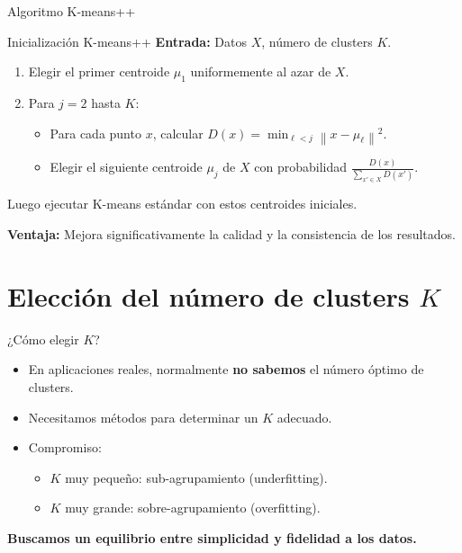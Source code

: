 \documentclass[aspectratio=169]{beamer}
\newcommand{\norm}[1]{\left\lVert #1 \right\rVert}
\begin{document}
\begin{frame}{Algoritmo K-means++}
    \begin{block}{Inicialización K-means++}
        \textbf{Entrada:} Datos \(X\), número de clusters \(K\).
        
        \begin{enumerate}
            \item Elegir el primer centroide \(\mu_1\) uniformemente al azar de \(X\).
            \item Para \(j = 2\) hasta \(K\):
            \begin{itemize}
                \item Para cada punto \(x\), calcular \(D(x) = \min_{\ell < j} \norm{x - \mu_\ell}^2\).
                \item Elegir el siguiente centroide \(\mu_j\) de \(X\) con probabilidad \(\frac{D(x)}{\sum_{x' \in X} D(x')}\).
            \end{itemize}
        \end{enumerate}
        
        Luego ejecutar K-means estándar con estos centroides iniciales.
    \end{block}
    
    \textbf{Ventaja:} Mejora significativamente la calidad y la consistencia de los resultados.
\end{frame}

\section{Elección del número de clusters \(K\)}

\begin{frame}{¿Cómo elegir \(K\)?}
    \begin{itemize}
        \item En aplicaciones reales, normalmente \textbf{no sabemos} el número óptimo de clusters.
        \item Necesitamos métodos para determinar un \(K\) adecuado.
        \item Compromiso:
        \begin{itemize}
            \item \(K\) muy pequeño: sub-agrupamiento (underfitting).
            \item \(K\) muy grande: sobre-agrupamiento (overfitting).
        \end{itemize}
    \end{itemize}
    
    \begin{center}
        \textbf{Buscamos un equilibrio entre simplicidad y fidelidad a los datos.}
    \end{center}
\end{frame}
\end{document}
